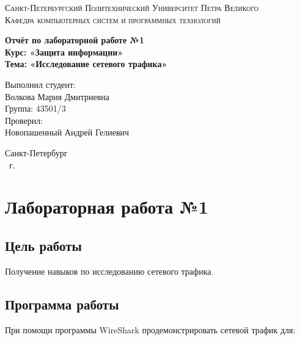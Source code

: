 \documentclass[14pt,a4paper,report]{report}
\begin{document}
\def\contentsname{Содержание}

\begin{titlepage}
	\begin{center}
		\textsc{Санкт-Петербургский Политехнический 
			Университет Петра Великого\\[5mm]
			Кафедра компьютерных систем и программных технологий}
		
		\vfill
		
		\textbf{Отчёт по лабораторной работе №1\\[3mm]
			Курс: «Защита информации»\\[6mm]
			Тема: «Исследование сетевого трафика»\\[35mm]
		}
	\end{center}
	
	\hfill
	\begin{minipage}{.5\textwidth}
		Выполнил студент:\\[2mm] 
		Волкова Мария Дмитриевна\\
		Группа: 43501/3\\[5mm]
		
		Проверил:\\[2mm] 
		Новопашенный Андрей Гелиевич
	\end{minipage}
	\vfill
	\begin{center}
		Санкт-Петербург\\ \the\year\ г.
	\end{center}
\end{titlepage}

\tableofcontents
\clearpage

\chapter{Лабораторная работа №1}

\section{Цель работы}

Получение навыков по исследованию сетевого трафика.

\section{Программа работы}

При помощи программы WireShark продемонстрировать сетевой трафик для:
\end{document}

